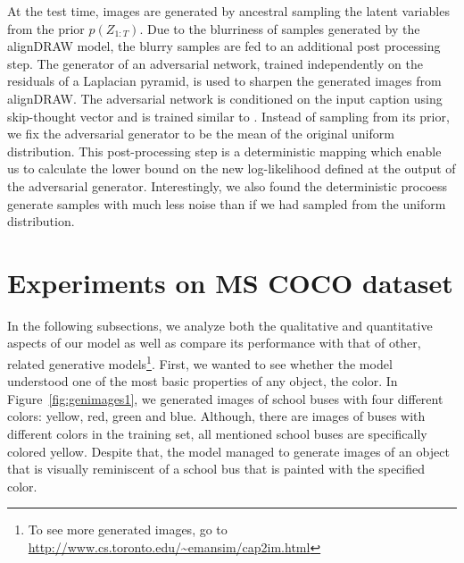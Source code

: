 \documentclass{article} %
\newcommand{\comm}[1]{}
\newcommand{\Lat}{Z}
\newcommand{\prior}{p}
\begin{document}
At the test time, images are generated by ancestral sampling the latent variables from the prior $\prior(\Lat_{1:T})$. Due to the blurriness of samples generated by the alignDRAW model, the blurry samples are fed to an additional post processing step. The generator of an adversarial network, trained independently on the residuals of a Laplacian pyramid, is used to sharpen the generated images from alignDRAW. The adversarial network is conditioned on the input caption using skip-thought vector \cite{skip-thought} and is trained similar to \citep{denton_lapgan}.    
Instead of sampling from its prior, we fix the adversarial generator to be the mean of the original uniform distribution. This post-processing step is a deterministic mapping which enable us to calculate the lower bound on the new log-likelihood defined at the output of the adversarial generator. Interestingly, we also found the deterministic procoess generate samples with much less noise than if we had sampled from the uniform distribution.

\comm{. The reconstruction loss becomes the loss between sharpened image and correct image, whereas the latent loss stays the same. We also noticed that inputting the mean of the uniform distribution into the edge generator network allowed us to generate samples with much less noise than if we had sampled from the uniform distribution.  }

\vspace{-0.2cm}
\section{Experiments on MS COCO dataset}

In the following subsections, we analyze both the qualitative and quantitative aspects of our model as well as compare its performance with that of other, related generative models\footnote{To see more generated images, go to \url{http://www.cs.toronto.edu/~emansim/cap2im.html}}.
First, we wanted to see whether the model understood one of the most basic properties of any object, the color. In Figure~\ref{fig:genimages1}, we generated images of school buses with four different colors: yellow, red, green and blue. Although, there are images of buses with different colors in the training set, all mentioned school buses are specifically colored yellow. Despite that, the model managed to generate images of an object that is visually reminiscent of a school bus that is painted with the specified color.
\end{document}
